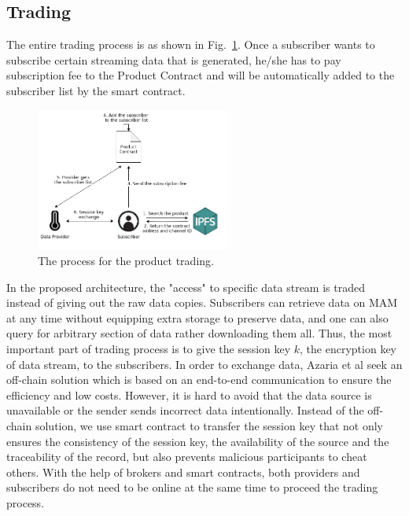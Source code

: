 \documentclass[conference]{IEEEtran}
\begin{document}
\subsection{Trading}
\label{section:trading}

The entire trading process is as shown in Fig.~\ref{fig:trading_product}. Once a subscriber wants to subscribe certain streaming data that is generated, he/she has to pay subscription fee to the Product Contract and will be automatically added to the subscriber list by the smart contract.

\begin{figure}[!t]
    \centering
    \includegraphics[width=2.5in]{trading_product}
    \caption{The process for the product trading.}
    \label{fig:trading_product}
\end{figure}

In the proposed architecture, the "access" to specific data stream is traded instead of giving out the raw data copies. Subscribers can retrieve data on MAM at any time without equipping extra storage to preserve data, and one can also query for arbitrary section of data rather downloading them all. Thus, the most important part of trading process is to give the session key $k$, the encryption key of data stream, to the subscribers. In order to exchange data, Azaria et al\cite{Medrec} seek an off-chain solution which is based on an end-to-end communication to ensure the efficiency and low costs. However, it is hard to avoid that the data source is unavailable or the sender sends incorrect data intentionally. Instead of the off-chain solution, we use smart contract to transfer the session key\cite{3tierDataMarket} that not only ensures the consistency of the session key, the availability of the source and the traceability of the record, but also prevents malicious participants to cheat others. With the help of brokers and smart contracts, both providers and subscribers do not need to be online at the same time to proceed the trading process.

\lstset{style=solidity}
\end{document}
